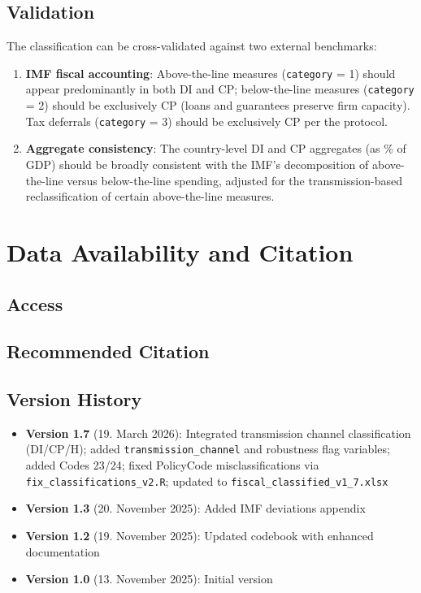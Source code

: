 \documentclass[12pt]{article}
\begin{document}
\subsection{Validation}

The classification can be cross-validated against two external benchmarks:

\begin{enumerate}
  \item \textbf{IMF fiscal accounting}: Above-the-line measures (\texttt{category} = 1) should appear predominantly in both DI and CP; below-the-line measures (\texttt{category} = 2) should be exclusively CP (loans and guarantees preserve firm capacity). Tax deferrals (\texttt{category} = 3) should be exclusively CP per the protocol.
  \item \textbf{Aggregate consistency}: The country-level DI and CP aggregates (as \% of GDP) should be broadly consistent with the IMF's decomposition of above-the-line versus below-the-line spending, adjusted for the transmission-based reclassification of certain above-the-line measures.
\end{enumerate}


\newpage
\section{Data Availability and Citation}

\subsection{Access}



\subsection{Recommended Citation}



\subsection{Version History}

\begin{itemize}
\item \textbf{Version 1.7} (19. March 2026): Integrated transmission channel classification (DI/CP/H); added \texttt{transmission\_channel} and robustness flag variables; added Codes 23/24; fixed PolicyCode misclassifications via \texttt{fix\_classifications\_v2.R}; updated to \texttt{fiscal\_classified\_v1\_7.xlsx}
\item \textbf{Version 1.3} (20. November 2025): Added IMF deviations appendix
\item \textbf{Version 1.2} (19. November 2025): Updated codebook with enhanced documentation
\item \textbf{Version 1.0} (13. November 2025): Initial version
\end{itemize}
\end{document}
